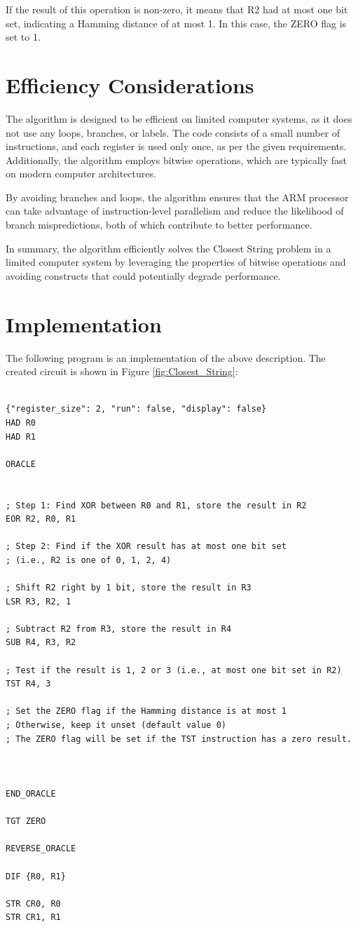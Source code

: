 If the result of this operation is non-zero, it means that R2 had at most one bit set, indicating a Hamming distance of at most 1. In this case, the ZERO flag is set to 1.

\section{Efficiency Considerations}

The algorithm is designed to be efficient on limited computer systems, as it does not use any loops, branches, or labels. The code consists of a small number of instructions, and each register is used only once, as per the given requirements. Additionally, the algorithm employs bitwise operations, which are typically fast on modern computer architectures.

By avoiding branches and loops, the algorithm ensures that the ARM processor can take advantage of instruction-level parallelism and reduce the likelihood of branch mispredictions, both of which contribute to better performance.

In summary, the algorithm efficiently solves the Closest String problem in a limited computer system by leveraging the properties of bitwise operations and avoiding constructs that could potentially degrade performance.



\section{Implementation}

The following program is an implementation of the above description. The created circuit is shown in Figure \ref{fig:Closest_String}:

\begin{lstlisting}

{"register_size": 2, "run": false, "display": false}
HAD R0
HAD R1

ORACLE


; Step 1: Find XOR between R0 and R1, store the result in R2
EOR R2, R0, R1

; Step 2: Find if the XOR result has at most one bit set
; (i.e., R2 is one of 0, 1, 2, 4)

; Shift R2 right by 1 bit, store the result in R3
LSR R3, R2, 1

; Subtract R2 from R3, store the result in R4
SUB R4, R3, R2

; Test if the result is 1, 2 or 3 (i.e., at most one bit set in R2)
TST R4, 3

; Set the ZERO flag if the Hamming distance is at most 1
; Otherwise, keep it unset (default value 0)
; The ZERO flag will be set if the TST instruction has a zero result.



END_ORACLE

TGT ZERO

REVERSE_ORACLE

DIF {R0, R1}

STR CR0, R0
STR CR1, R1


\end{lstlisting}

